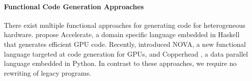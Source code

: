 \paragraph*{Functional Code Generation Approaches}
    There exist multiple functional approaches for generating code for
    heterogeneous hardware.
    \citet{chakravarty11accelerating,mcdonell13optimising} propose Accelerate,
    a domain specific language embedded in Haskell that generates efficient GPU
    code.
    Recently, \citet{collins14nova} introduced NOVA, a new functional language
    targeted at code generation for GPUs, and Copperhead
    \cite{catanzaro11copperhead}, a data parallel language embedded in Python.
    In contrast to these approaches, we require no rewriting of legacy programs.


